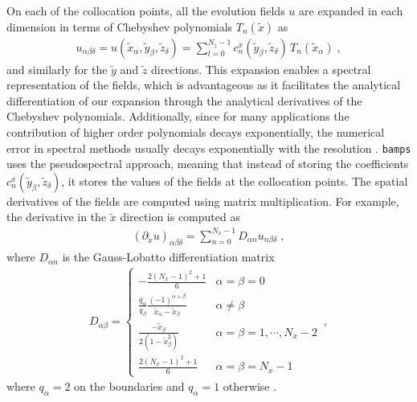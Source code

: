 On each of the collocation points, all the evolution fields $u$ are expanded in each dimension in terms of Chebyshev polynomials $T_n(\tilde{x})$ as
%
\begin{align}
 u_{\alpha \beta \delta} = u(\tilde{x}_\alpha, \tilde{y}_\beta, \tilde{z}_\delta) = \sum_{l=0}^{N_z -1} c^x_n(\tilde{y}_\beta, \tilde{z}_\delta) \, T_n(\tilde{x}_\alpha) \; ,
\end{align}
%
and similarly for the $\tilde{y}$ and $\tilde{z}$ directions. This expansion enables a spectral representation of the fields, which is advantageous as it facilitates the analytical differentiation of our expansion through the analytical derivatives of the Chebyshev polynomials. Additionally, since for many applications the contribution of higher order polynomials decays exponentially, the numerical error in spectral methods usually decays exponentially with the resolution \cite{Numerical_Relativity_Solving_Einsteins_Equations_on_the_Computer}. \texttt{bamps} uses the pseudospectral approach, meaning that instead of storing the coefficients $c^x_n(\tilde{y}_\beta, \tilde{z}_\delta)$, it stores the values of the fields at the collocation points. The spatial derivatives of the fields are computed using matrix multiplication. For example, the derivative in the $\tilde{x}$ direction is computed as
%
\begin{align}
    (\partial_{\tilde{x}} u)_{\alpha \beta \delta} = \sum_{n=0}^{N_x -1} D_{\alpha n} u_{n \beta \delta} \; ,
\end{align}
%
where $D_{\alpha n}$ is the Gauss-Lobatto differentiation matrix
%
\begin{align}
    D_{\alpha\beta}=
    \begin{cases}
        -\frac{2(N_x-1)^2+1}{6} & \alpha=\beta=0 \\
        \frac{q_\alpha}{q_\beta}\frac{(-1)^{\alpha+\beta}}{\tilde{x}_\alpha-\tilde{x}_\beta} & \alpha\neq\beta \\
        \frac{-\tilde{x}_\beta}{2(1-\tilde{x}_\beta^2)} & \alpha=\beta=1,\cdots,N_x-2 \\
        \frac{2(N_x-1)^2+1}{6} & \alpha=\beta=N_x-1
    \end{cases} \, ,
\end{align}
%
where $q_\alpha = 2$ on the boundaries and $q_\alpha = 1$ otherwise \cite{Pseudospectral_method_for_gravitational_wave_collapse,Numerical_Relativity_Solving_Einsteins_Equations_on_the_Computer}.

